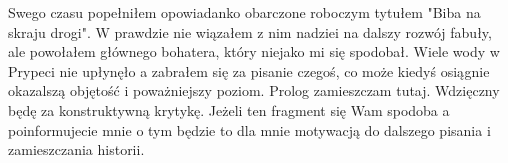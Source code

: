 \documentclass[../MAIN.tex]{subfiles}
\begin{document}
Swego czasu popełniłem opowiadanko obarczone roboczym tytułem "Biba na skraju drogi". W prawdzie nie wiązałem z nim nadziei na dalszy rozwój fabuły, ale powołałem głównego bohatera, który niejako mi się spodobał. Wiele wody w Prypeci nie upłynęło a zabrałem się za pisanie czegoś, co może kiedyś osiągnie okazalszą objętość i poważniejszy poziom. Prolog zamieszczam tutaj. Wdzięczny będę za konstruktywną krytykę. Jeżeli ten fragment się Wam spodoba a poinformujecie mnie o tym będzie to dla mnie motywacją do dalszego pisania i zamieszczania historii.
\end{document}
